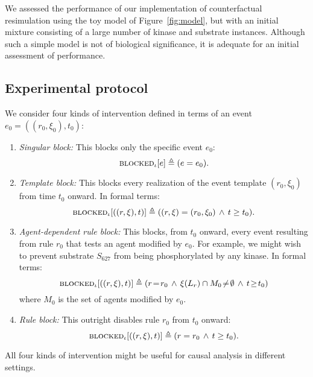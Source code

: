 
\newcommand{\subs}[2]{#1_{\textsf{#2}}}

We assessed the performance of our implementation of counterfactual
resimulation using the toy model of Figure~\ref{fig:model}, but with an initial
mixture consisting of a large number of kinase and substrate instances. Although
such a simple model is not of biological significance, it is adequate for an
initial assessment of performance.

\subsection{Experimental protocol}

We consider four kinds of intervention defined in terms of an event
$e_0=((r_0, \xi_0), t_0)$:
\begin{enumerate}[leftmargin=0.4cm]
\item \textit{Singular block:} This blocks only the specific event $e_0$:
\[{\textsc{blocked}}_{\iota}[e] \triangleq (e = e_0).\]
\item \textit{Template block:} This blocks every realization of the event template $(r_0, \xi_0)$ from time $t_0$ onward. In formal terms:
\[{\textsc{blocked}}_{\iota}[((r, \xi), t)] \triangleq ((r, \xi) = (r_0, \xi_0)
\,\wedge\, t \geq t_0).\]
\item \textit{Agent-dependent rule block:} This blocks, from
$t_0$ onward, every event resulting from rule $r_0$ that tests an agent
modified by $e_0$. For example, we might wish to prevent substrate $S_{627}$ from being phosphorylated by any kinase. In formal terms: \[{\textsc{blocked}}_{\iota}[((r, \xi), t)] \triangleq (r \!=\! r_0 \,\wedge\, \xi(L_r)\cap M_0 \!\neq\! \emptyset \,\wedge\, t \!\geq\! t_0)\] where $M_0$ is the set of agents modified by $e_0$.
\item \textit{Rule block:} This outright disables rule
$r_0$ from $t_0$ onward:
\[{\textsc{blocked}}_{\iota}[((r, \xi), t)] \triangleq (r = r_0 \,\wedge\, t \geq t_0).\]
\end{enumerate}
All four kinds of intervention might be useful for causal analysis in
different settings.

